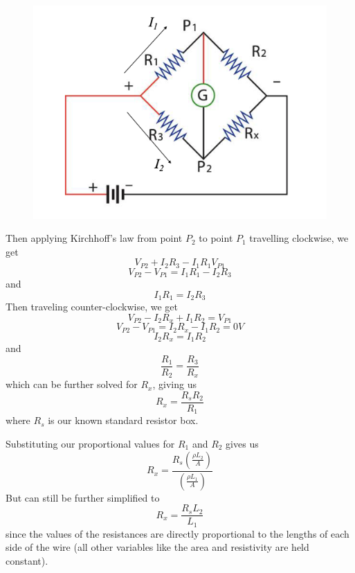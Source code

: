 \documentclass[titlepage]{article}
\begin{document}
        \FloatBarrier
        \begin{figure}[hbt!] 
            \centering 
            \includegraphics[scale = 0.4]{exanal/wheatstone}
        \end{figure}
        \FloatBarrier

        Then applying Kirchhoff's law from point $P_2$ to point $P_1$ travelling clockwise, we get $$V_{P2}+I_2 R_3 - I_1 R_1  V_{P1} $$ 
        $$ V_{P2} - V_{P1} = I_1 R_1 - I_2 R_3 $$
        and $$ I_1 R_1 = I_2 R_3$$
        Then traveling counter-clockwise, we get $$V_{P2}-I_2 R_x + I_1 R_2 = V_{P1} $$
        $$ V_{P2} - V_{P1} = I_2 R_x - I_1 R_2 = 0V $$
        $$I_2 R_x = I_1 R_2 $$
        and $$\frac{R_1}{R_2} = \frac{R_3}{R_x} $$ which can be further solved for $R_x$, giving us 
        $$R_x = \frac{R_s R_2}{R_1} $$
        where $R_s$ is our known standard resistor box. 

        Substituting our proportional values for $R_1$ and $R_2$ gives us $$R_x = \frac{R_s \left( \frac{\rho L_2}{A} \right)}{\left( \frac{\rho L_1}{A}  \right)} $$ But can still be further simplified to $$R_x=\frac{R_s L_2}{L_1} $$
since the values of the resistances are directly proportional to the lengths of each side of the wire (all other variables like the area and resistivity are held constant). 
\end{document}
